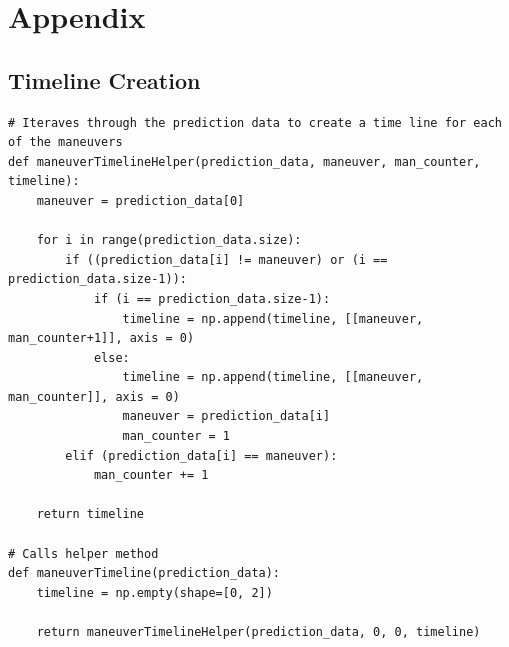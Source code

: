 \documentclass{article}
\begin{document}
\appendix
\section{Appendix}
\subsection{Timeline Creation}
\label{sec:timeline}
\begin{lstlisting}
# Iteraves through the prediction data to create a time line for each of the maneuvers
def maneuverTimelineHelper(prediction_data, maneuver, man_counter, timeline):
	maneuver = prediction_data[0]

	for i in range(prediction_data.size):
		if ((prediction_data[i] != maneuver) or (i == prediction_data.size-1)):
			if (i == prediction_data.size-1):
				timeline = np.append(timeline, [[maneuver, man_counter+1]], axis = 0)
			else:
				timeline = np.append(timeline, [[maneuver, man_counter]], axis = 0)
				maneuver = prediction_data[i]
				man_counter = 1
		elif (prediction_data[i] == maneuver):
			man_counter += 1

	return timeline

# Calls helper method
def maneuverTimeline(prediction_data):
	timeline = np.empty(shape=[0, 2])

	return maneuverTimelineHelper(prediction_data, 0, 0, timeline)
\end{lstlisting}
\end{document}
